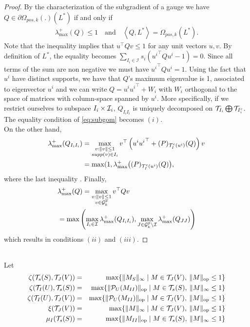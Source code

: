 \documentclass[letterpaper]{article}
\begin{document}
\begin{proof}
By the characterization of the subgradient of a gauge we have  $Q\in \partial \Omega_{pos,k}(.)(L^*)$ if and only if
\begin{align}
\lambda_{\max}^+(Q)\leq 1\quad \text{and} \quad \left\langle Q,L^*\right\rangle=\Omega_{pos,k}(L^*). \label{eq:subgom}
\end{align}
Note that the inequality implies that $u^{\top}Qv\leq1$ for any unit vectors $u,v$. By definition of $L^*$, the equality becomes $\sum_{I_i\in\mathcal{I}}s_i ({u^i}^{\top}Qu^i-1)=0$. Since all terms of the sum are non negative we must have ${u^i}^{\top}Qu^i=1$. Using the fact that $u^i$ have distinct supports, we have that $Q$'s maximum eigenvalue is 1, associated to eigenvector $u^i$ and we can write $Q=u^i{u^i}^{\top} + W_i$ with $W_i$ orthogonal to the space of matrices with column-space spanned by $u^i$. More specifically, if we restrict ourselves to subspace $I_i\times\mathcal{I}_i$, $Q_{I_iI_i}$ is uniquely decomposed on $\mathcal{T}_{I_i}\bigoplus \mathcal{T}_{I_i^c}$. The equality condition of \ref{eq:subgom} becomes $(i)$.\\ On the other hand,
\begin{align*}
\lambda_{\max}^+(Q_{I_iI_i})
&=\max_{\substack{v: \|v\|\leq 1\\ supp(v)\in I_i }}v^{\top}\left(u^i{u^i}^{\top} + \mathcal(P)_{\mathcal{T}_I^c(u^i)}(Q) \right)v \\
&=\max(1,\lambda_{\max}^+\big (\mathcal(P)_{\mathcal{T}_I^c(u^i)}(Q) \big ),
\end{align*}
where the last inequality .
Finally,
\begin{align*}
&\lambda_{\max}^+(Q) = \max_{\substack{v: \|v\|\leq 1\\ v\in \mathcal{G}^p_k }}v^{\top}Qv\\
&= \max \left( \max_{I_i\in \mathcal{I}}\lambda_{\max}^+(Q_{I_iI_i}), \max_{J \in \mathcal{G}^p_k \backslash \mathcal{I}} \lambda_{\max}^+(Q_{JJ})\right)
\end{align*}
which results in conditions $(ii)$ and $(iii)$.
\end{proof}

\\

Let 
\begin{eqnarray*}
\zeta(\mathcal{T}_s(S),\mathcal{T}_J(V))&=&\max \{ {\|M_S\|_\infty} \mid M \in \mathcal{T}_J(V), \: \|M\|_{{\rm op}}\leq 1\}\\
\zeta(\mathcal{T}_I(U),\mathcal{T}_s(S))&=&\max \{ {\|\mathcal{P}_{U}(M_{II})\|_{{\rm op}}} \mid M \in \mathcal{T}_s(S), \: \|M\|_{\infty}\leq 1\}\\
\zeta(\mathcal{T}_I(U),\mathcal{T}_J(V))&=&\max \{ {\|\mathcal{P}_{U}(M_{II})\|_{{\rm op}}} \mid  M \in \mathcal{T}_J(V), \: \|M\|_{{\rm op}}\leq 1\}\\
\xi(\mathcal{T}_J(V))&=&\max \{ {\|M\|_\infty} \mid M \in \mathcal{T}_J(V), \: \|M\|_{{\rm op}}\leq 1\}\\
\mu_I(\mathcal{T}_s(S))&=&\max \{ {\|M_{II}\|_{\rm op}} \mid M \in \mathcal{T}_s(S), \: \|M\|_{\infty}\leq 1\}\\
\end{eqnarray*}
\end{document}
